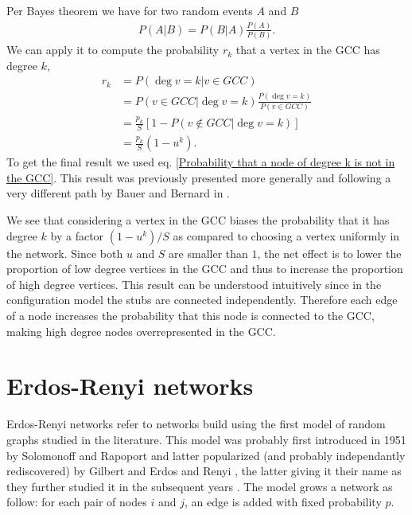 \documentclass[
11pt, %
american, %
singlespacing, %
final, %
nolistspacing, %
liststotoc, %
headsepline, %
]{MastersDoctoralThesis} %
\begin{document}
Per Bayes theorem we have for two random events $A$ and $B$
\begin{align}
	P(A | B) = P(B | A) \frac{P(A)}{P(B)}. \label{Bayes theorem}
\end{align}
We can apply it to compute the probability $r_k$ that a vertex in the GCC has degree $k$,
\begin{align}
	r_k &= P\left(\deg{v} = k | v \in GCC\right)\\
	&= P(v \in GCC | \deg{v} = k) \frac{P(\deg{v} = k)}{P(v \in GCC)} \\
	&= \frac{p_k}{S} \left[1 - P(v \notin GCC | \deg{v} = k)\right] \\
	&= \frac{p_k}{S} (1 - u^k). \label{Degree distribution in GCC}
\end{align}
To get the final result we used eq. \eqref{Probability that a node of degree k is not in the GCC}. This result was previously presented more generally and following a very different path by Bauer and Bernard in \cite{bauer2002maximal}.

We see that considering a vertex in the GCC biases the probability that it has degree $k$ by a factor $(1 - u^k)/S$ as compared to choosing a vertex uniformly in the network. Since both $u$ and $S$ are smaller than $1$, the net effect is to lower the proportion of low degree vertices in the GCC and thus to increase the proportion of high degree vertices. This result can be understood intuitively since in the configuration model the stubs are connected independently. Therefore each edge of a node increases the probability that this node is connected to the GCC, making high degree nodes overrepresented in the GCC.

\section{Erdos-Renyi networks}

Erdos-Renyi networks refer to networks build using the first model of random graphs studied in the literature. This model was probably first introduced in 1951 by Solomonoff and Rapoport \cite{solomonoff1951connectivity} and latter popularized (and probably independantly rediscovered) by Gilbert \cite{gilbert1959random} and Erdos and Renyi \cite{erdos1959random}, the latter giving it their name as they further studied it in the subsequent years \cite{erdos1960evolution, erdos1961strength}. The model grows a network as follow: for each pair of nodes $i$ and $j$, an edge is added with fixed probability $p$.
\end{document}
